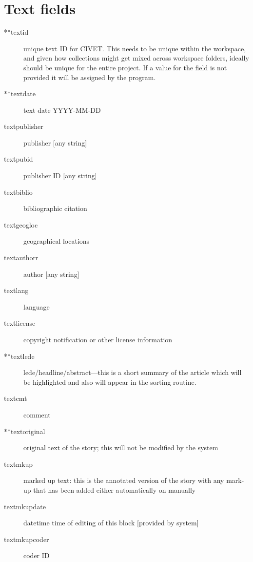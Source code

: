 \documentclass[letterpaper,10pt,english]{sphinxmanual}
\begin{document}
\section{Text fields}
\label{appendix2:text-fields}\begin{description}
\item[{**textid}] \leavevmode
unique text ID for CIVET. This needs to be unique within the
workspace, and given how collections might get mixed across
workspace folders, ideally should be unique for the entire project.
If a value for the  field is not provided it will be
assigned by the program.

\item[{**textdate}] \leavevmode
text date YYYY-MM-DD

\item[{textpublisher}] \leavevmode
publisher {[}any string{]}

\item[{textpubid}] \leavevmode
publisher ID {[}any string{]}

\item[{textbiblio}] \leavevmode
bibliographic citation

\item[{textgeogloc}] \leavevmode
geographical locations

\item[{textauthorr}] \leavevmode
author {[}any string{]}

\item[{textlang}] \leavevmode
language

\item[{textlicense}] \leavevmode
copyright notification or other license information

\item[{**textlede}] \leavevmode
lede/headline/abstract—this is a short summary of the article
which will be highlighted and also will appear in the sorting
routine.

\item[{textcmt}] \leavevmode
comment

\item[{**textoriginal}] \leavevmode
original text of the story; this will not be modified by the system

\item[{textmkup}] \leavevmode
marked up text: this is the annotated version of the story with
any mark-up that has been added either automatically on manually

\item[{textmkupdate}] \leavevmode
datetime time of editing of this block {[}provided by system{]}

\item[{textmkupcoder}] \leavevmode
coder ID

\end{description}
\end{document}
